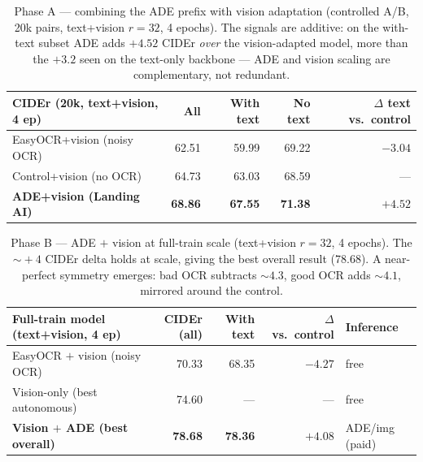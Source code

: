\begin{table}[t]
  \centering
  \caption{Phase A --- combining the ADE prefix with vision adaptation
    (controlled A/B, 20k pairs, text+vision $r{=}32$, 4 epochs). The signals are
    additive: on the with-text subset ADE adds $+4.52$ CIDEr \emph{over} the
    vision-adapted model, more than the $+3.2$ seen on the text-only backbone ---
    ADE and vision scaling are complementary, not redundant.}
  \label{tab:phaseA-ade-vision}
  \begin{tabular}{lrrrr}
    \toprule
    CIDEr (20k, text+vision, 4 ep) & All & With text & No text & $\Delta$ text vs.\ control \\
    \midrule
    EasyOCR+vision (noisy OCR)     & 62.51 & 59.99 & 69.22 & $-3.04$ \\
    Control+vision (no OCR)        & 64.73 & 63.03 & 68.59 & --- \\
    \textbf{ADE+vision (Landing AI)} & \textbf{68.86} & \textbf{67.55} & \textbf{71.38} & \textbf{$+4.52$} \\
    \bottomrule
  \end{tabular}
\end{table}

\begin{table}[t]
  \centering
  \caption{Phase B --- ADE $+$ vision at full-train scale (text+vision $r{=}32$,
    4 epochs). The $\sim\!+4$ CIDEr delta holds at scale, giving the best overall
    result (78.68). A near-perfect symmetry emerges: bad OCR subtracts
    ${\sim}4.3$, good OCR adds ${\sim}4.1$, mirrored around the control.}
  \label{tab:phaseB-ade-vision}
  \begin{tabular}{lrrrl}
    \toprule
    Full-train model (text+vision, 4 ep) & CIDEr (all) & With text & $\Delta$ vs.\ control & Inference \\
    \midrule
    EasyOCR $+$ vision (noisy OCR)        & 70.33 & 68.35 & $-4.27$ & free \\
    Vision-only (best autonomous)         & 74.60 & ---   & ---     & free \\
    \textbf{Vision $+$ ADE (best overall)} & \textbf{78.68} & \textbf{78.36} & $+4.08$ & ADE/img (paid) \\
    \bottomrule
  \end{tabular}
\end{table}

